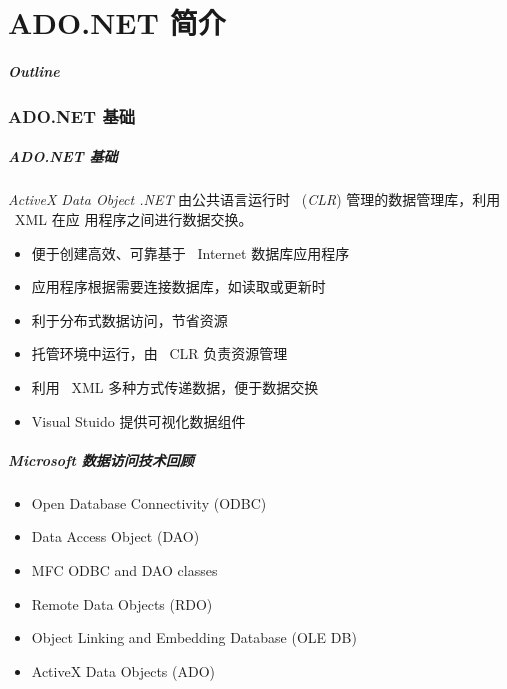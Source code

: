 
\part{ADO.NET 简介}
\begin{frame}
\frametitle{Outline}
\tableofcontents
\end{frame}

\section{ADO.NET 基础}

\begin{frame}
\frametitle{ADO.NET 基础}
\begin{block}{\textit{ActiveX Data Object .NET}}
  \CJKindent 由公共语言运行时 ~(\textit{CLR}) 管理的数据管理库，利用 ~XML 在应
  用程序之间进行数据交换。
\end{block}
\begin{itemize}
\item 便于创建高效、可靠基于 ~Internet 数据库应用程序
\item 应用程序根据需要连接数据库，如读取或更新时
\item 利于分布式数据访问，节省资源
\item 托管环境中运行，由 ~CLR 负责资源管理
\item 利用 ~XML 多种方式传递数据，便于数据交换
\item Visual Stuido 提供可视化数据组件
\end{itemize}
\end{frame}

\begin{frame}
\frametitle{Microsoft 数据访问技术回顾}
\begin{itemize}
\setlength{\itemsep}{8pt plus 1pt}
\item Open Database Connectivity (ODBC)
\item Data Access Object (DAO)
\item MFC ODBC and DAO classes
\item Remote Data Objects (RDO)
\item Object Linking and Embedding Database (OLE DB)
\item ActiveX Data Objects (ADO)
\end{itemize}
\end{frame}

